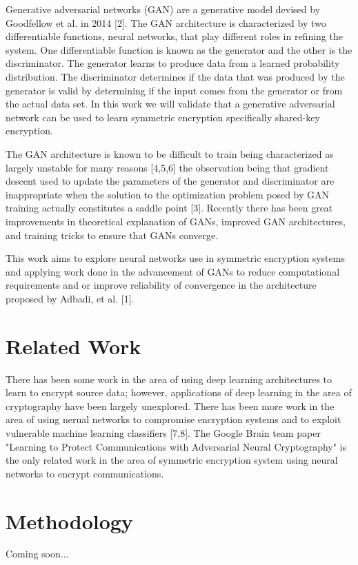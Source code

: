 \documentclass[12pt]{article}
\begin{document}
Generative adversarial networks (GAN) are a generative model devised by Goodfellow et al. in 2014 [2]. The GAN architecture is characterized by two differentiable functions, neural networks, that play different roles in refining the system. One differentiable function is known as the generator and the other is the discriminator. The generator learns to produce data from a learned probability distribution. The discriminator determines if the data that was produced by the generator is valid by determining if the input comes from the generator or from the actual data set. In this work we will validate that a generative adversarial network can be used to learn symmetric encryption specifically shared-key encryption.

The GAN architecture is known to be difficult to train being characterized as largely unstable for many reasons [4,5,6] the observation being that gradient descent used to update the parameters of the generator and discriminator are inappropriate when the solution to the optimization problem posed by GAN training actually constitutes a saddle point [3]. Recently there has been great improvements in theoretical explanation of GANs, improved GAN architectures, and training tricks to ensure that GANs converge.

This work aims to explore neural networks use in symmetric encryption systems and applying work done in the advancement of GANs to reduce computational requirements and or improve reliability of convergence in the architecture proposed by Adbadi, et al. [1].

\section{Related Work}
There has been some work in the area of using deep learning architectures to learn to encrypt source data; however, applications of deep learning in the area of cryptography have been largely unexplored. There has been more work in the area of using nerual networks to compromise encryption systems and to exploit vulnerable machine learning classifiers [7,8]. The Google Brain team paper "Learning to Protect Communications with Adversarial Neural Cryptography" is the only related work in the area of symmetric encryption system using neural networks to encrypt communications.

\section{Methodology}
Coming soon...
\end{document}

